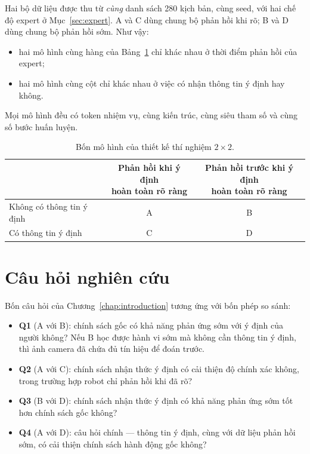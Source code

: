 Hai bộ dữ liệu được thu từ \emph{cùng} danh sách 280 kịch bản, cùng seed, với hai chế độ expert ở Mục~\ref{sec:expert}. A và C dùng chung bộ phản hồi khi rõ; B và D dùng chung bộ phản hồi sớm. Như vậy:
\begin{itemize}
  \item hai mô hình cùng hàng của Bảng~\ref{tab:2x2} chỉ khác nhau ở thời điểm phản hồi của expert;
  \item hai mô hình cùng cột chỉ khác nhau ở việc có nhận thông tin ý định hay không.
\end{itemize}
Mọi mô hình đều có token nhiệm vụ, cùng kiến trúc, cùng siêu tham số và cùng số bước huấn luyện.

\begin{table}[htbp]
  \centering
  \caption{Bốn mô hình của thiết kế thí nghiệm $2\times2$.}
  \label{tab:2x2}
  \begin{tabular}{@{}lcc@{}}
    \toprule
    & \makecell{Phản hồi khi ý định\\hoàn toàn rõ ràng} & \makecell{Phản hồi trước khi ý định\\hoàn toàn rõ ràng} \\
    \midrule
    Không có thông tin ý định & A & B \\
    Có thông tin ý định       & C & D \\
    \bottomrule
  \end{tabular}
\end{table}

\section{Câu hỏi nghiên cứu}
\label{sec:research-questions}

Bốn câu hỏi của Chương~\ref{chap:introduction} tương ứng với bốn phép so sánh:
\begin{itemize}
  \item \textbf{Q1} (A với B): chính sách gốc có khả năng phản ứng sớm với ý định của người không? Nếu B học được hành vi sớm mà không cần thông tin ý định, thì ảnh camera đã chứa đủ tín hiệu để đoán trước.
  \item \textbf{Q2} (A với C): chính sách nhận thức ý định có cải thiện độ chính xác không, trong trường hợp robot chỉ phản hồi khi đã rõ?
  \item \textbf{Q3} (B với D): chính sách nhận thức ý định có khả năng phản ứng sớm tốt hơn chính sách gốc không?
  \item \textbf{Q4} (A với D): câu hỏi chính --- thông tin ý định, cùng với dữ liệu phản hồi sớm, có cải thiện chính sách hành động gốc không?
\end{itemize}

